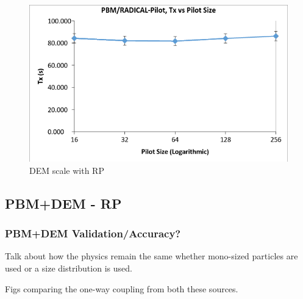 \documentclass[preprint,11pt,authoryear]{elsarticle}
\begin{document}
	      \begin{figure}[H]
	      \centering
	      \includegraphics[scale=0.5]{rslts_pbmbyrp_strng}
	      \caption{ DEM scale with RP}
	      \label{fig:rslts_dembyRP_strng}
	      \end{figure}
	      
	 
	    
	  \subsection{PBM+DEM - RP} 
	    \subsubsection{PBM+DEM Validation/Accuracy?}
	   	\par Talk about how the physics remain the same whether mono-sized particles are used or a size distribution is used.
	   \par Figs comparing the one-way coupling from both these sources.
	    
\end{document}
